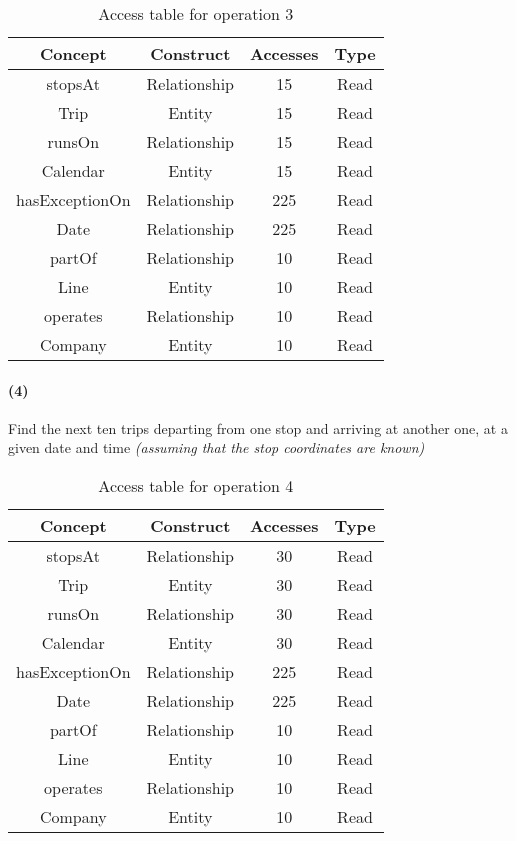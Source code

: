	\begin{table}[h!]
		\centering
		\begin{tabular}{|c|c|c|c|}
			\hline
			\textbf{Concept} & \textbf{Construct} & \textbf{Accesses} & \textbf{Type} \\
			\hline
			stopsAt & Relationship & 15 & Read \\ \hline
			Trip & Entity & 15 & Read \\ \hline
			runsOn & Relationship & 15 & Read \\ \hline
			Calendar & Entity & 15 & Read \\ \hline
			hasExceptionOn & Relationship & 225 & Read \\ \hline
			Date & Relationship & 225 & Read \\ \hline
			partOf & Relationship & 10 & Read \\ \hline
			Line & Entity & 10 & Read \\ \hline
			operates & Relationship & 10 & Read \\ \hline
			Company & Entity & 10 & Read \\ \hline
		\end{tabular}
		\caption{Access table for operation 3}\label{tbl:access-3}
	\end{table}

	\paragraph{(4)} Find the next ten trips departing from one stop and arriving at another one, at a given date and time \textit{(assuming that the stop coordinates are known)}
 
	\begin{table}[h!]
		\centering
		\begin{tabular}{|c|c|c|c|}
			\hline
			\textbf{Concept} & \textbf{Construct} & \textbf{Accesses} & \textbf{Type} \\
			\hline
			stopsAt & Relationship & 30 & Read \\ \hline
			Trip & Entity & 30 & Read \\ \hline
			runsOn & Relationship & 30 & Read \\ \hline
			Calendar & Entity & 30 & Read \\ \hline
			hasExceptionOn & Relationship & 225 & Read \\ \hline
			Date & Relationship & 225 & Read \\ \hline
			partOf & Relationship & 10 & Read \\ \hline
			Line & Entity & 10 & Read \\ \hline
			operates & Relationship & 10 & Read \\ \hline
			Company & Entity & 10 & Read \\ \hline
		\end{tabular}
		\caption{Access table for operation 4}\label{tbl:access-4}
	\end{table}

